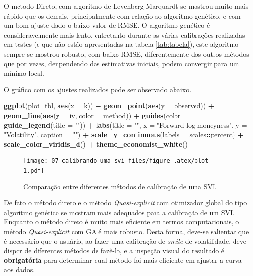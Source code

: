 \documentclass[]{book}
\newenvironment{Shaded}{\begin{snugshade}}{\end{snugshade}}
\newcommand{\KeywordTok}[1]{\textcolor[rgb]{0.13,0.29,0.53}{\textbf{#1}}}
\newcommand{\DataTypeTok}[1]{\textcolor[rgb]{0.13,0.29,0.53}{#1}}
\newcommand{\StringTok}[1]{\textcolor[rgb]{0.31,0.60,0.02}{#1}}
\newcommand{\OperatorTok}[1]{\textcolor[rgb]{0.81,0.36,0.00}{\textbf{#1}}}
\newcommand{\NormalTok}[1]{#1}
\theoremstyle{definition}
\theoremstyle{definition}
\theoremstyle{definition}
\theoremstyle{remark}
\begin{document}
O método Direto, com algoritmo de Levenberg-Marquardt se mostrou muito
mais rápido que os demais, principalmente com relação ao algoritmo
genético, e com um bom ajuste dado o baixo valor de RMSE. O algoritmo
genético é consideravelmente mais lento, entretanto durante as várias
calibrações realizadas em testes (e que não estão apresentadas na tabela
\ref{tab:tabela}), este algoritmo sempre se mostrou robusto, com baixo
RMSE, diferentemente dos outros métodos que por vezes, denpendendo das
estimativas iniciais, podem convergir para um mínimo local.

O gráfico com os ajustes realizados pode ser observado abaixo.




\begin{Shaded}
\begin{Highlighting}[]
\KeywordTok{ggplot}\NormalTok{(plot_tbl, }\KeywordTok{aes}\NormalTok{(}\DataTypeTok{x =}\NormalTok{ k)) }\OperatorTok{+}\StringTok{ }
\StringTok{  }\KeywordTok{geom_point}\NormalTok{(}\KeywordTok{aes}\NormalTok{(}\DataTypeTok{y =}\NormalTok{ observed)) }\OperatorTok{+}
\StringTok{  }\KeywordTok{geom_line}\NormalTok{(}\KeywordTok{aes}\NormalTok{(}\DataTypeTok{y =}\NormalTok{ iv, }\DataTypeTok{color =}\NormalTok{ method)) }\OperatorTok{+}
\StringTok{  }\KeywordTok{guides}\NormalTok{(}\DataTypeTok{color =} \KeywordTok{guide_legend}\NormalTok{(}\DataTypeTok{title =} \StringTok{""}\NormalTok{)) }\OperatorTok{+}
\StringTok{  }\KeywordTok{labs}\NormalTok{(}\DataTypeTok{title =} \StringTok{""}\NormalTok{,}
       \DataTypeTok{x =} \StringTok{"Forward log-moneyness"}\NormalTok{,}
       \DataTypeTok{y =} \StringTok{"Volatility"}\NormalTok{,}
       \DataTypeTok{caption =} \StringTok{""}\NormalTok{) }\OperatorTok{+}
\StringTok{  }\KeywordTok{scale_y_continuous}\NormalTok{(}\DataTypeTok{labels =}\NormalTok{ scales}\OperatorTok{::}\NormalTok{percent) }\OperatorTok{+}
\StringTok{  }\KeywordTok{scale_color_viridis_d}\NormalTok{() }\OperatorTok{+}
\StringTok{  }\KeywordTok{theme_economist_white}\NormalTok{()}
\end{Highlighting}
\end{Shaded}

\begin{figure}
\centering
\texttt{[image: 07-calibrando-uma-svi\_files/figure-latex/plot-1.pdf]}
\caption{\label{fig:plot}Comparação entre diferentes métodos de calibração de uma
SVI.}
\end{figure}

De fato o método direto e o método \emph{Quasi-explicit} com otimizador
global do tipo algoritmo genético se mostram mais adequados para a
calibração de um SVI. Enquanto o método direto é muito mais eficiente em
termos computacionais, o método \emph{Quasi-explicit} com GA é mais
robusto. Desta forma, deve-se salientar que é necessário que o usuário,
ao fazer uma calibração de \emph{smile} de volatilidade, deve dispor de
diferentes métodos de fazê-lo, e a inspeção visual do resultado é
\textbf{obrigatória} para determinar qual método foi mais eficiente em
ajustar a curva aos dados.
\end{document}
